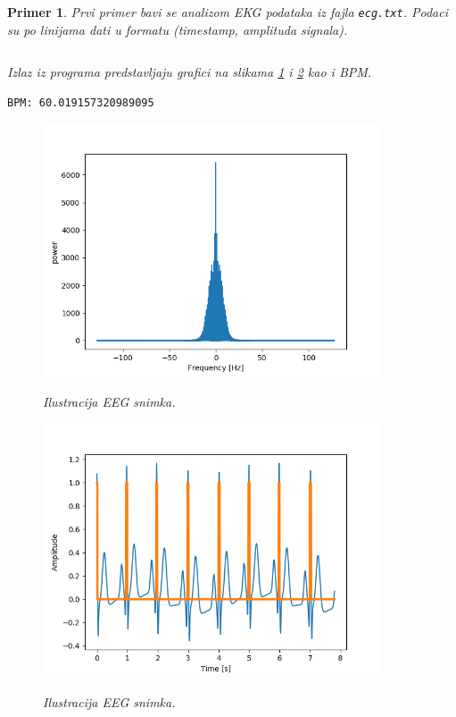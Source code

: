 \documentclass[a4paper]{article}
\newtheorem{primer}{Primer}[section]
\begin{document}
\begin{primer}
Prvi primer bavi se analizom EKG podataka iz fajla \texttt{ecg.txt}.
Podaci su po linijama dati u formatu (timestamp, amplituda signala). 

\inputminted{python}{Codes/3/ecgscript.py}
Izlaz iz programa predstavljaju grafici na slikama \ref{fig:ecgF1} i \ref{fig:ecgF2} kao i BPM.
\begin{lstlisting}
BPM: 60.019157320989095
\end{lstlisting}
\begin{figure}[t]
\includegraphics[width=10cm]{Codes/3/ecg_Figure_1.png}
\centering
\label{fig:ecgF1}
\caption{Ilustracija EEG snimka.}
\end{figure}
\begin{figure}[t]
\includegraphics[width=10cm]{Codes/3/ecg_Figure_2.png}
\centering
\label{fig:ecgF2}
\caption{Ilustracija EEG snimka.}
\end{figure}

\end{primer}

%
%

\appendix
 

\end{document}
